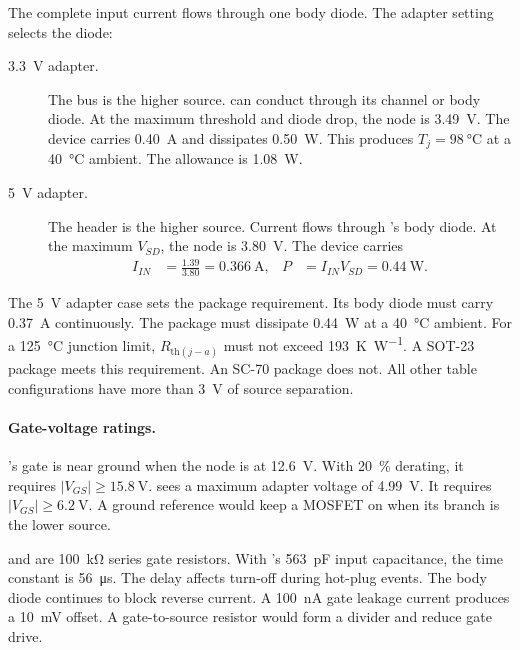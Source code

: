 The complete input current flows through one body diode. The adapter setting
selects the diode:
\begin{description}
  \item[\SI{3.3}{\volt} adapter.] The bus is the higher source.
     can conduct through its channel or body diode. At the
    maximum threshold and diode drop, the node is \SI{3.49}{\volt}. The device
    carries \SI{0.40}{\ampere} and dissipates \SI{0.50}{\watt}. This produces
    $T_j=\SI{98}{\celsius}$ at a \SI{40}{\celsius} ambient. The allowance is
    \SI{1.08}{\watt}.
  \item[\SI{5}{\volt} adapter.] The header is the higher source. Current flows
    through 's body diode. At the maximum $V_{SD}$, the node is
    \SI{3.80}{\volt}. The device carries
    \begin{align*}
      I_{IN} &= \frac{1.39}{3.80} = \SI{0.366}{\ampere}, &
      P &= I_{IN}V_{SD} = \SI{0.44}{\watt}.
    \end{align*}
\end{description}

The \SI{5}{\volt} adapter case sets the  package requirement.
Its body diode must carry \SI{0.37}{\ampere} continuously. The package must
dissipate \SI{0.44}{\watt} at a \SI{40}{\celsius} ambient. For a
\SI{125}{\celsius} junction limit, $R_{\mathrm{th}(j-a)}$ must not exceed
\SI{193}{\kelvin\per\watt}. A SOT-23 package meets this requirement. An SC-70
package does not. All other table configurations have more than
\SI{3}{\volt} of source separation.

\paragraph{Gate-voltage ratings.} 's gate is near ground when
the node is at \SI{12.6}{\volt}. With \SI{20}{\percent} derating, it requires
$|V_{GS}|\geq\SI{15.8}{\volt}$.  sees a maximum adapter voltage
of \SI{4.99}{\volt}. It requires $|V_{GS}|\geq\SI{6.2}{\volt}$. A ground
reference would keep a MOSFET on when its branch is the lower source.

 and  are \SI{100}{\kilo\ohm} series gate
resistors. With 's \SI{563}{\pico\farad} input capacitance, the
time constant is \SI{56}{\micro\second}. The delay affects turn-off during
hot-plug events. The body diode continues to block reverse current. A
\SI{100}{\nano\ampere} gate leakage current produces a
\SI{10}{\milli\volt} offset. A gate-to-source resistor would form a divider
and reduce gate drive.

